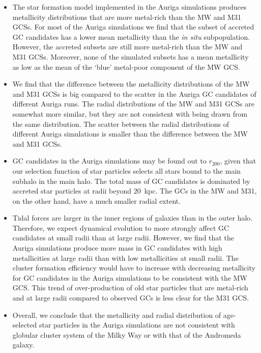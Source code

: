 \documentclass[a4paper,fleqn,usenatbib]{mnras}
\begin{document}
\begin{itemize}
    \item The star formation model implemented in the Auriga simulations produces
    metallicity distributions that are more metal-rich than the MW and M31
    GCSs. For most of the Auriga simulations we find that the subset of accreted 
    GC candidates has a lower mean metallicity than the {\it in situ} subpopulation.
    However, the accreted subsets are still more metal-rich than the MW and M31 GCSs.
    Moreover, none of the simulated subsets has a mean metallicity as low as the mean
    of the `blue' metal-poor component of the MW GCS.

    \item We find that the difference between the metallicity distributions of 
    the MW and M31 GCSs is big compared to the scatter in the Auriga GC candidates 
    of different Auriga runs. The radial distributions of the MW and M31 GCSs are
    somewhat more similar, but they are not consistent with being drawn from the
    same distribution. The scatter between the radial distributions of different
    Auriga simulations is smaller than the difference between the MW and M31 GCSs.

    \item GC candidates in the Auriga simulations may be found out to $r_{200}$,
    given that our selection function of star particles selects all stars bound
    to the main subhalo in the main halo. The total mass of GC candidates is 
    dominated by accreted star particles at radii beyond $20$~kpc. The GCs in 
    the MW and M31, on the other hand, have a much smaller radial extent.

    \item Tidal forces are larger in the inner regions of galaxies than in the
    outer halo. Therefore, we expect dynamical evolution to more strongly affect 
    GC candidates at small radii than at large radii. However,
    we find that the Auriga simulations produce more mass in GC candidates with
    high metallicities at large radii than with low metallicities at small radii.
    The cluster formation efficiency would have to increase with decreasing
    metallicity for GC candidates in the Auriga simulations to be consistent
    with the MW GCS. This trend of over-production of old star particles that 
    are metal-rich and at large radii compared to observed GCs is less clear for 
    the M31 GCS.

    \item
    Overall, we conclude that the metallicity and radial distribution of age-selected
    star particles in the Auriga simulations are not consistent with globular 
    cluster system of the Milky Way or with that of the Andromeda galaxy.


\end{itemize}
\end{document}

